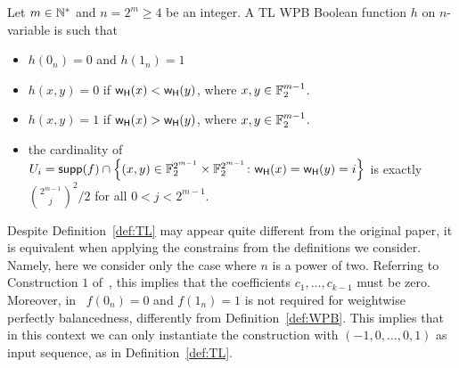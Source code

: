 \documentclass{llncs}
\begin{document}

\begin{definition}\label{def:TL}
	Let $m \in \mathbb{N}^*$ and $n = 2^m \ge 4$ be an integer. A TL WPB Boolean function $h$ on $n$-variable is such that
	\begin{itemize}
	 \item $h(0_n)=0$ and $h(1_n)=1$ 
	 \item $h(x,y)=0$ if $\mathsf{w_H}(x)<\mathsf{w_H}(y)$, where $x,y \in \mathbb{F}_2^{m-1}$.
	 \item $h(x,y)=1$ if $\mathsf{w_H}(x)>\mathsf{w_H}(y)$, where $x,y \in \mathbb{F}_2^{m-1}$.
	 \item the cardinality of $U_i=\mathsf{supp}(f)\cap\left\{(x,y)\in\mathbb{F}_2^{2^{m-1}}\times \mathbb{F}_2^{2^{m-1}}\colon \mathsf{w_H}(x)=\mathsf{w_H}(y)=i\right\}$ is exactly $\binom{2^{m-1}}{j}^2/2$ for all $0<j<2^{m-1}$.
	\end{itemize}	
\end{definition}
\begin{remark}
 Despite Definition~\ref{def:TL} may appear quite different from the original paper, it is equivalent when applying the constrains from the definitions we consider. 
 Namely, here we consider only the case where $n$ is a power of two. Referring to Construction $1$ of~\cite{CC:TangLiu19}, this implies that the coefficients $c_1,\dots,c_{k-1}$ must be zero. Moreover, in~\cite{CC:TangLiu19} $f(0_n)=0$ and $f(1_n)=1$ is not required for weightwise perfectly balancedness, differently from Definition~\ref{def:WPB}. 
 This implies that in this context we can only instantiate the construction with $(-1,0,\ldots,0,1)$ as input sequence, \ie as in Definition~\ref{def:TL}. 
\end{remark}

\end{document}

